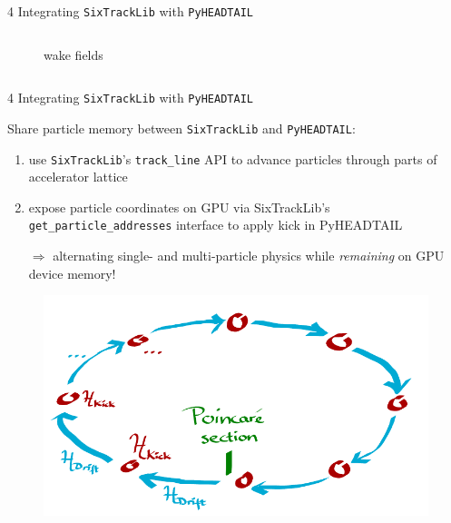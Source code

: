 \documentclass{beamer}
\begin{document}
\begin{frame}{4 Integrating \texttt{SixTrackLib} with \texttt{PyHEADTAIL}}
\begin{columns}
\begin{column}[b]{0.45\linewidth}
\begin{figure}
                \caption{wake fields}
            \end{figure}
        \end{column}
    \end{columns}
\end{frame}

\begin{frame}{4 Integrating \texttt{SixTrackLib} with \texttt{PyHEADTAIL}}

    Share particle memory between  \texttt{SixTrackLib} and  \texttt{PyHEADTAIL}:
    \begin{enumerate}
        \item use  \texttt{SixTrackLib}'s \texttt{track\_line} API to advance particles through parts of accelerator lattice
        \item expose particle coordinates on GPU via SixTrackLib's \texttt{get\_particle\_addresses} interface to apply kick in PyHEADTAIL
        \item[$\Longrightarrow$] alternating single- and multi-particle physics while \emph{remaining} on GPU device memory!
    \end{enumerate}
    
    \begin{figure}
        \centering
        \includegraphics[width=0.5\linewidth]{adrian_figs/transverse-model.pdf}
    \end{figure}
\end{frame}
\end{document}
